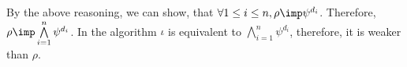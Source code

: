 By the above reasoning, we can show, that $\forall 1 \le i \le n, \rho \imp \psi^{d_i}$.
Therefore, $\rho \imp \bigwedge \limits_{i=1}^{n} \psi^{d_i}$.
In the \IndGen algorithm $\iota$ is equivalent to $\bigwedge \limits_{i=1}^{n} \psi^{d_i}$,
therefore, it is weaker than $\rho$.

%

%
%
%
%
%
%
%
%
